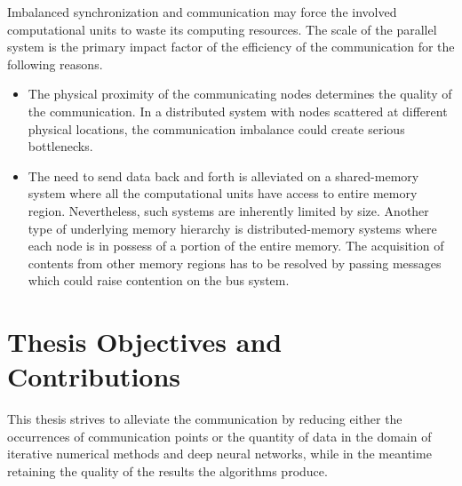 Imbalanced synchronization and communication may force the involved computational 
units to waste its computing resources. The scale of the parallel 
system is the primary impact factor of the efficiency of the communication for 
the following reasons.
\begin{itemize}
    \item The physical proximity of the communicating nodes determines the 
        quality of the communication. In a distributed system with nodes 
        scattered at different physical locations, the communication imbalance 
        could create serious bottlenecks.
    \item The need to send data back and forth is alleviated on a shared-memory 
        system where all the computational units have access to entire memory 
        region.  Nevertheless, such systems are inherently limited by size.  
        Another type of underlying memory hierarchy is distributed-memory 
        systems where each node is in possess of a portion of the entire memory.  
        The acquisition of contents from other memory regions has to be resolved 
        by passing messages which could raise contention on the bus system.
\end{itemize}
 
\section{Thesis Objectives and Contributions}
This thesis strives to alleviate the communication by reducing either the 
occurrences of communication points or the quantity of data in the domain of 
iterative numerical methods and deep neural networks, while in the meantime 
retaining the quality of the results the algorithms produce. 

